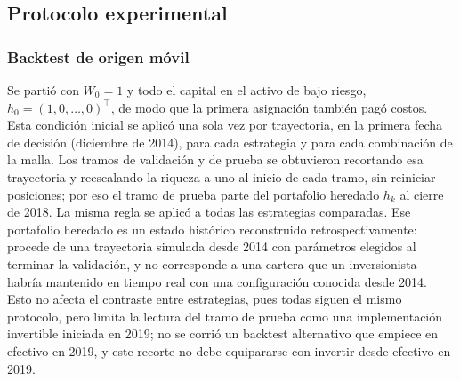 \subsection{Protocolo experimental}\label{sec:protocolo}

\subsubsection{Backtest de origen móvil}


Se partió con $W_0=1$ y todo el capital en el activo de bajo riesgo, $h_0=(1,0,\dots,0)^\top$, de modo que la primera asignación también pagó costos. Esta condición inicial se aplicó una sola vez por trayectoria, en la primera fecha de decisión (diciembre de 2014), para cada estrategia y para cada combinación de la malla. Los tramos de validación y de prueba se obtuvieron recortando esa trayectoria y reescalando la riqueza a uno al inicio de cada tramo, sin reiniciar posiciones; por eso el tramo de prueba parte del portafolio heredado $h_k$ al cierre de 2018. La misma regla se aplicó a todas las estrategias comparadas. Ese portafolio heredado es un estado histórico reconstruido retrospectivamente: procede de una trayectoria simulada desde 2014 con parámetros elegidos al terminar la validación, y no corresponde a una cartera que un inversionista habría mantenido en tiempo real con una configuración conocida desde 2014. Esto no afecta el contraste entre estrategias, pues todas siguen el mismo protocolo, pero limita la lectura del tramo de prueba como una implementación invertible iniciada en 2019; no se corrió un backtest alternativo que empiece en efectivo en 2019, y este recorte no debe equipararse con invertir desde efectivo en 2019.
